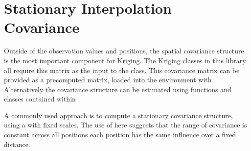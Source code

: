 \documentclass[letterpaper,10pt,english]{sphinxmanual}
\begin{document}
\sphinxstepscope


\chapter{Stationary Interpolation Covariance}
\label{\detokenize{covariance:stationary-interpolation-covariance}}\label{\detokenize{covariance::doc}}
\sphinxAtStartPar
Outside of the observation values and positions, the spatial covariance structure is the most
important component for Kriging. The Kriging classes in this library all require this matrix as the
input to the class. This covariance matrix can be provided as a pre\sphinxhyphen{}computed matrix, loaded into the
environment with {\hyperref[\detokenize{covariance:glomar_gridding.interpolation_covariance.load_covariance}]{}}. Alternatively
the covariance structure can be estimated using functions and classes contained within
.

\sphinxAtStartPar
A commonly used approach is to compute a stationary covariance structure, using a  with
fixed scales. The use of  here suggests that the range of covariance is constant across
all positions \sphinxhyphen{} each position has the same influence over a fixed distance.
\end{document}
